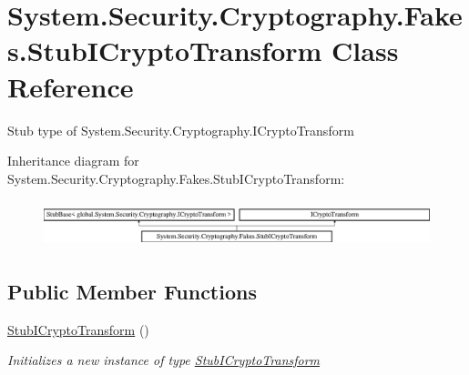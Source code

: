 \hypertarget{class_system_1_1_security_1_1_cryptography_1_1_fakes_1_1_stub_i_crypto_transform}{\section{System.\-Security.\-Cryptography.\-Fakes.\-Stub\-I\-Crypto\-Transform Class Reference}
\label{class_system_1_1_security_1_1_cryptography_1_1_fakes_1_1_stub_i_crypto_transform}
}


Stub type of System.\-Security.\-Cryptography.\-I\-Crypto\-Transform 


Inheritance diagram for System.\-Security.\-Cryptography.\-Fakes.\-Stub\-I\-Crypto\-Transform\-:\begin{figure}[H]
\begin{center}
\leavevmode
\includegraphics[height=1.365854cm]{class_system_1_1_security_1_1_cryptography_1_1_fakes_1_1_stub_i_crypto_transform}
\end{center}
\end{figure}
\subsection*{Public Member Functions}
\begin{DoxyCompactItemize}
\item 
\hyperlink{class_system_1_1_security_1_1_cryptography_1_1_fakes_1_1_stub_i_crypto_transform_a3d99004440734263b62ca035cc4923d7}{Stub\-I\-Crypto\-Transform} ()
\begin{DoxyCompactList}\small\item\em Initializes a new instance of type \hyperlink{class_system_1_1_security_1_1_cryptography_1_1_fakes_1_1_stub_i_crypto_transform}{Stub\-I\-Crypto\-Transform}\end{DoxyCompactList}\end{DoxyCompactItemize}
